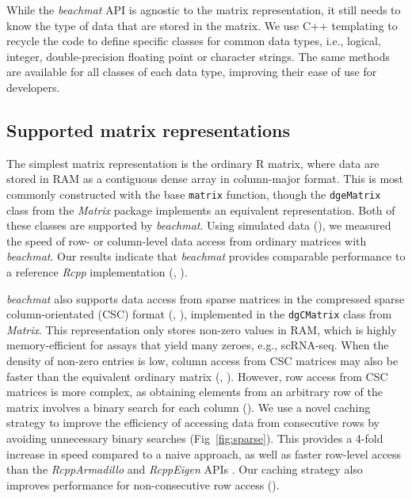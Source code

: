 \documentclass[10pt,letterpaper]{article}
\newcommand{\beachmat}{\textit{beachmat}}
\begin{document}
While the \beachmat{} API is agnostic to the matrix representation, it still needs to know the type of data that are stored in the matrix.
We use C++ templating to recycle the code to define specific classes for common data types, i.e., logical, integer, double-precision floating point or character strings.
The same methods are available for all classes of each data type, improving their ease of use for developers.

\subsection*{Supported matrix representations}
The simplest matrix representation is the ordinary R matrix, where data are stored in RAM as a contiguous dense array in column-major format.
This is most commonly constructed with the base \texttt{matrix} function, though the \texttt{dgeMatrix} class from the \textit{Matrix} package implements an equivalent representation.
Both of these classes are supported by \beachmat{}.
Using simulated data (\suppsecsimdesign{}), we measured the speed of row- or column-level data access from ordinary matrices with \beachmat{}.
Our results indicate that \beachmat{} provides comparable performance to a reference \textit{Rcpp} implementation 
(\suppsecsimple{}, \suppfigsimpleaccess{}). 

\beachmat{} also supports data access from sparse matrices in the compressed sparse column-orientated (CSC) format (\suppsecsparseschem{}, \suppfigsparseschem{}), implemented in the \texttt{dgCMatrix} class from \textit{Matrix}.
This representation only stores non-zero values in RAM, which is highly memory-efficient for assays that yield many zeroes, e.g., scRNA-seq.
When the density of non-zero entries is low, column access from CSC matrices may also be faster than the equivalent ordinary matrix (\suppsecsparsecol{}, \suppfigsparsecol{}).
However, row access from CSC matrices is more complex, as obtaining elements from an arbitrary row of the matrix involves a binary search for each column (\suppsecsparserow{}).
We use a novel caching strategy to improve the efficiency of accessing data from consecutive rows by avoiding unnecessary binary searches (Fig~\ref{fig:sparse}).
This provides a 4-fold increase in speed compared to a naive approach, as well as faster row-level access than the \textit{RcppArmadillo} and \textit{RcppEigen} APIs \cite{eddelbuettel2014arma,bates2013fast}.
Our caching strategy also improves performance for non-consecutive row access (\suppfigsparserandom{}).
\end{document}

